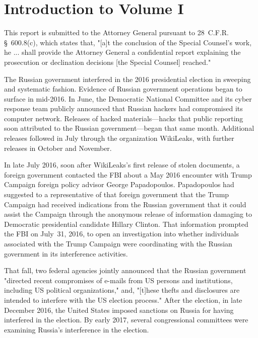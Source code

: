 \section*{Introduction to Volume I}
\label{sec:introduction-1}

This report is submitted to the Attorney General pursuant to 28~C.F.R. \S~600.8(c), which states that, "[a]t the conclusion of the Special Counsel's work, he ... shall provide the Attorney General a confidential report explaining the prosecution or declination decisions [the Special Counsel] reached."

The Russian government interfered in the 2016 presidential election in sweeping and systematic fashion.
Evidence of Russian government operations began to surface in mid-2016.
In June, the Democratic National Committee and its cyber response team publicly announced that Russian hackers had compromised its computer network. Releases of hacked materials---hacks that public reporting soon attributed to the Russian government---began that same month.
Additional releases followed in July through the organization WikiLeaks, with further releases in October and November.

In late July 2016, soon after WikiLeaks's first release of stolen documents, a foreign government contacted the FBI about a May 2016 encounter with Trump Campaign foreign policy advisor George Papadopoulos.
Papadopoulos had suggested to a representative of that foreign government that the Trump Campaign had received indications from the Russian government that it could assist the Campaign through the anonymous release of information damaging to Democratic presidential candidate Hillary Clinton.
That information prompted the FBI on July~31, 2016, to open an investigation into whether individuals associated with the Trump Campaign were coordinating with the Russian government in its interference activities.

That fall, two federal agencies jointly announced that the Russian government "directed recent compromises of e-mails from US persons and institutions, including US political organizations," and, "[t]hese thefts and disclosures are intended to interfere with the US election process."
After the election, in late December 2016, the United States imposed sanctions on Russia for having interfered in the election. By early 2017, several congressional committees were examining Russia's interference in the election.

